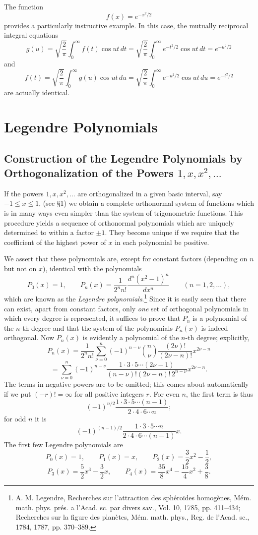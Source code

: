 \subsection{}
The function
\[
f(x)=e^{-x^2/2}
\]
provides a particularly instructive example. In this case, the mutually reciprocal integral equations
\[
g(u)=\sqrt{\frac2\pi}\int_0^{\infty}f(t)\cos ut\,dt
=\sqrt{\frac2\pi}\int_0^{\infty}e^{-t^2/2}\cos ut\,dt=e^{-u^2/2}
\]
and
\[
f(t)=\sqrt{\frac2\pi}\int_0^{\infty}g(u)\cos ut\,du
=\sqrt{\frac2\pi}\int_0^{\infty}e^{-u^2/2}\cos ut\,du=e^{-t^2/2}
\]
are actually identical.

\section{Legendre Polynomials}
\subsection{Construction of the Legendre Polynomials by Orthogonalization of the Powers $1,x,x^2,\ldots$}
If the powers $1,x,x^2,\ldots$ are orthogonalized in a given basic interval, say $-1\le x\le1$, (see \S1) we obtain a complete orthonormal system of functions which is in many ways even simpler than the system of trigonometric functions. This procedure yields a sequence of orthonormal polynomials which are uniquely determined to within a factor $\pm1$. They become unique if we require that the coefficient of the highest power of $x$ in each polynomial be positive.

We assert that these polynomials are, except for constant factors (depending on $n$ but not on $x$), identical with the polynomials
\[
P_0(x)=1,\qquad
P_n(x)=\frac1{2^n n!}\frac{d^n(x^2-1)^n}{dx^n}
\qquad(n=1,2,\ldots),
\]
which are known as the \emph{Legendre polynomials}.\footnote{A. M. Legendre, Recherches sur l'attraction des sph\'ero\"ides homog\`enes, M\'em. math. phys. pr\'es. a l'Acad. sc. par divers sav., Vol. 10, 1785, pp. 411--434; Recherches sur la figure des plan\`etes, M\'em. math. phys., Reg. de l'Acad. sc., 1784, 1787, pp. 370--389.}
Since it is easily seen that there can exist, apart from constant factors, only \emph{one} set of orthogonal polynomials in which every degree is represented, it suffices to prove that $P_n$ is a polynomial of the $n$-th degree and that the system of the polynomials $P_n(x)$ is indeed orthogonal. Now $P_n(x)$ is evidently a polynomial of the $n$-th degree; explicitly,
\[
P_n(x)=\frac1{2^n n!}\sum_{\nu=0}^{n}(-1)^{n-\nu}
\binom n\nu\frac{(2\nu)!}{(2\nu-n)!}x^{2\nu-n}
\]
\[
=\sum_{\nu=0}^{n}(-1)^{n-\nu}
\frac{1\cdot3\cdot5\cdots(2\nu-1)}{(n-\nu)!(2\nu-n)!\,2^{n-\nu}}
 x^{2\nu-n}.
\]
The terms in negative powers are to be omitted; this comes about automatically if we put $(-r)!=\infty$ for all positive integers $r$. For even $n$, the first term is thus
\[
(-1)^{n/2}\frac{1\cdot3\cdot5\cdots(n-1)}{2\cdot4\cdot6\cdots n};
\]
for odd $n$ it is
\[
(-1)^{(n-1)/2}\frac{1\cdot3\cdot5\cdots n}{2\cdot4\cdot6\cdots(n-1)}x.
\]
The first few Legendre polynomials are
\[
P_0(x)=1,\qquad P_1(x)=x,\qquad P_2(x)=\frac32x^2-\frac12,
\]
\[
P_3(x)=\frac52x^3-\frac32x,\qquad
P_4(x)=\frac{35}{8}x^4-\frac{15}{4}x^2+\frac38.
\]

